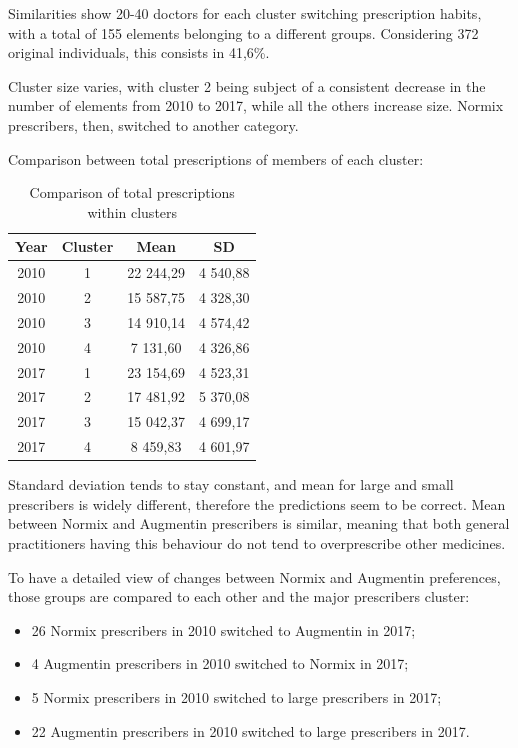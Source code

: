 Similarities show 20-40 doctors for each cluster switching prescription habits, with a total of 155 elements belonging to a different groups. Considering 372 original individuals, this consists in 41,6\%.

Cluster size varies, with cluster 2 being subject of a consistent decrease in the number of elements from 2010 to 2017, while all the others increase size. Normix prescribers, then, switched to another category.

Comparison between total prescriptions of members of each cluster:
\begin{table}[h]
	\centering
	\begin{tabular}{c|c|c|c}
		\textbf{Year} & \textbf{Cluster} & \textbf{Mean} & \textbf{SD} \\
		\hline
		2010 & 1 & 22 244,29 & 4 540,88 \\
		\hline
		2010 & 2 & 15 587,75 & 4 328,30 \\
		\hline
		2010 & 3 & 14 910,14 & 4 574,42 \\
		\hline
		2010 & 4 & 7 131,60 & 4 326,86 \\
		\hline
		2017 & 1 & 23 154,69 & 4 523,31 \\
		\hline
		2017 & 2 & 17 481,92 & 5 370,08 \\
		\hline
		2017 & 3 & 15 042,37 &4 699,17 \\
		\hline
		2017 & 4 & 8 459,83 & 4 601,97 \\
	\end{tabular}
	\caption{\small Comparison of total prescriptions within clusters}
\end{table}

Standard deviation tends to stay constant, and mean for large and small prescribers is widely different, therefore the predictions seem to be correct. Mean between Normix and Augmentin prescribers is similar, meaning that both general practitioners having this behaviour do not tend to overprescribe other medicines.

To have a detailed view of changes between Normix and Augmentin preferences, those groups are compared to each other and the major prescribers cluster:
\begin{itemize}
	\item 26 Normix prescribers in 2010 switched to Augmentin in 2017;
	\item 4 Augmentin prescribers in 2010 switched to Normix in 2017;
	\item 5 Normix prescribers in 2010 switched to large prescribers in 2017;
	\item 22 Augmentin prescribers in 2010 switched to large prescribers in 2017.
\end{itemize}

